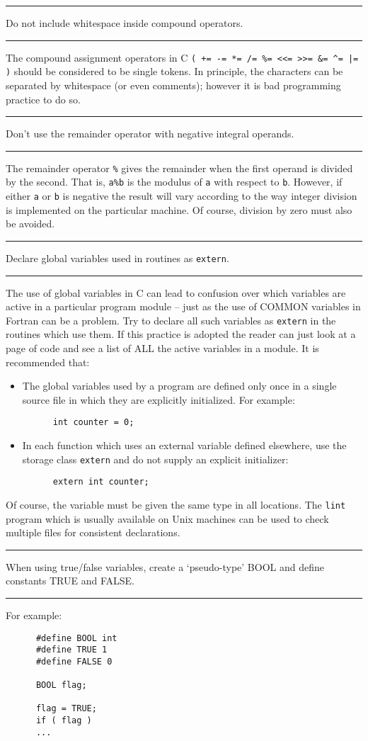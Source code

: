 \documentclass[twoside,11pt]{article}
\newcounter{sruleno}
\newcommand{\srule}[1]{
    \addtocounter{sruleno}{1}
    \goodbreak
    \rule[0.5ex]{\textwidth}{0.3mm}
    {\Large #1 \hfill {\thesruleno}}
    \rule[0.5ex]{\textwidth}{0.1mm}
}
\newcommand{\srule}[1]{
       \addtocounter{sruleno}{1}
       \begin{rawhtml} <HR> \end{rawhtml}
       {\Large \thesruleno}~~~~{\Large #1}
       \begin{rawhtml} <HR> \end{rawhtml}
       \end{tabular}
  }
\begin{document}
\srule{Do not include whitespace inside compound operators.}
The compound assignment operators in C
\verb~( += -= *= /= %= <<= >>= &= ^= |= )~
should be considered to be single tokens. In principle, the characters can
be separated by whitespace (or even comments); however it is bad programming
practice to do so.

\srule{Don't use the remainder operator with negative integral operands.}
The remainder operator \verb~%~ gives the remainder when the first operand is
divided by the second. That is, {\tt a\%b} is the modulus of {\tt a}
with respect to {\tt b}.
However, if either {\tt a} or {\tt b} is negative the result will vary according to the
way integer division is implemented on the particular machine.
Of course, division by zero must also be avoided.


\srule{Declare global variables used in routines as {\tt extern}.}
The use of global variables in C can lead to confusion over which
variables are active in a particular program module --
just as the use of COMMON variables in Fortran can be a problem.
Try to declare  all such variables as {\tt extern} in the routines which
use them.
If this practice is adopted the reader can just look at a page of code
and see a list of ALL the active variables in a module.
It is recommended that:
\begin{itemize}
\item The global variables used by a program are defined only once
in a single source file  in which they are explicitly initialized.
For example:
\begin{verbatim}
      int counter = 0;
\end{verbatim}
\item In each function which uses an external variable defined elsewhere,
 use the storage class {\tt extern} and do not supply
an explicit initializer:
\begin{verbatim}
      extern int counter;
\end{verbatim}
\end{itemize}
Of course, the variable must be given the same type in all
locations.
The {\tt lint} program which is usually available on Unix machines can be
used to check multiple files for consistent declarations.

\srule{When using true/false variables, create a `pseudo-type' BOOL and define
  constants TRUE and FALSE.}
For example:
\begin{verbatim}
      #define BOOL int
      #define TRUE 1
      #define FALSE 0

      BOOL flag;

      flag = TRUE;
      if ( flag )
      ...
\end{verbatim}
\end{document}
